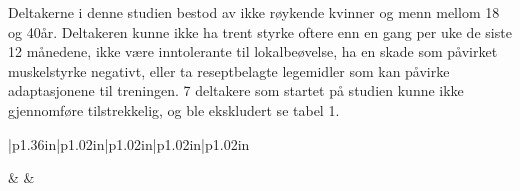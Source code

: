 \documentclass[
]{book}
\begin{document}
Deltakerne i denne studien bestod av ikke røykende kvinner og menn mellom 18 og 40år. Deltakeren kunne ikke ha trent styrke oftere enn en gang per uke de siste 12 månedene, ikke være inntolerante til lokalbeøvelse, ha en skade som påvirket muskelstyrke negativt, eller ta reseptbelagte legemidler som kan påvirke adaptasjonene til treningen. 7 deltakere som startet på studien kunne ikke gjennomføre tilstrekkelig, og ble ekskludert se tabel 1.

\providecommand{\docline}[3]{\noalign{\global\setlength{\arrayrulewidth}{#1}}\arrayrulecolor[HTML]{#2}\cline{#3}}

\setlength{\tabcolsep}{2pt}

\renewcommand*{\arraystretch}{1.5}

\begin{longtable}[c]{|p{1.36in}|p{1.02in}|p{1.02in}|p{1.02in}|p{1.02in}}




 &  &  \\



\end{longtable}
\end{document}
